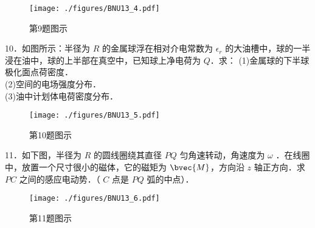 \begin{figure}[ht]
\centering
\texttt{[image: ./figures/BNU13\_4.pdf]}
\caption{第9题图示} \label{BNU13_fig4}
\end{figure}
10．如图所示：半径为 $R$ 的金属球浮在相对介电常数为 $\epsilon_r$ 的大油槽中，球的一半浸在油中，球的上半部在真空中，已知球上净电荷为 $Q$．求：
(1)金属球的下半球极化面点荷密度．\\
(2)空间的电场强度分布．\\
(3)油中计划体电荷密度分布．
\begin{figure}[ht]
\centering
\texttt{[image: ./figures/BNU13\_5.pdf]}
\caption{第10题图示} \label{BNU13_fig5}
\end{figure}
11．如下图，半径为 $R$ 的圆线圈绕其直径 $PQ$ 匀角速转动，角速度为 $\omega$ ．在线圈中，放置一个尺寸很小的磁体，它的磁矩为 $
\bvec{M}$，方向沿 $z$ 轴正方向．求 $PC$ 之间的感应电动势．（ $C$ 点是 $PQ$ 弧的中点）．
\begin{figure}[ht]
\centering
\texttt{[image: ./figures/BNU13\_6.pdf]}
\caption{第11题图示} \label{BNU13_fig6}
\end{figure}